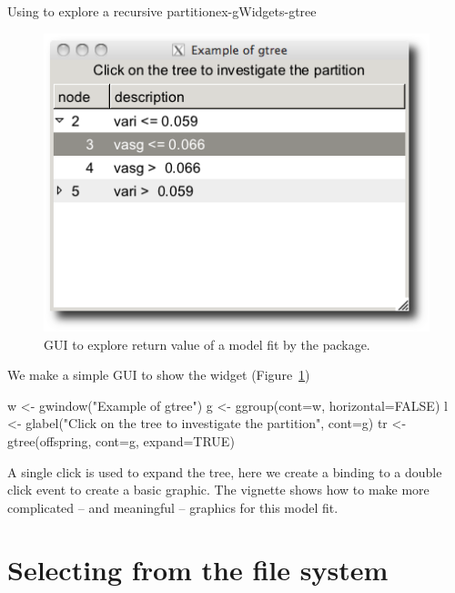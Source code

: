 \begin{example}{Using  to explore a recursive partition}{ex-gWidgets-gtree}
\begin{Schunk}
\end{Schunk}

\begin{figure}
  \centering
  \includegraphics[width=.5\textwidth]{ex-gWidgets-gtree}
  \caption{GUI to explore return value of a model fit by the   package.}
  \label{fig:ex-gWidgets-gtree-party}
\end{figure}


We make a simple GUI to show the widget (Figure~\ref{fig:ex-gWidgets-gtree-party})
\begin{Schunk}
\begin{Sinput}
 w <- gwindow("Example of gtree")
 g <- ggroup(cont=w, horizontal=FALSE)
 l <- glabel("Click on the tree to investigate the partition", 
             cont=g)
 tr <- gtree(offspring, cont=g, expand=TRUE)
\end{Sinput}
\end{Schunk}

A single click is used to expand the tree, here we create a binding to
a double click event to create a basic graphic. The 
vignette shows how to make more complicated -- and meaningful --
graphics for this model fit.
\begin{Schunk}
\end{Schunk}
\end{example}

\section{Selecting from the file system}
\label{sec:gWidgets-selecting-from-file}

